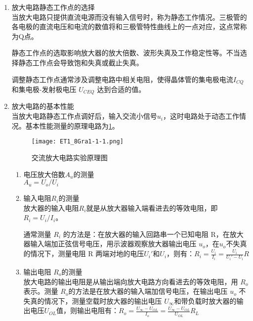 \documentclass[dvipsnames, svgnames,a4paper,11pt]{article}
\begin{document}
	\begin{enumerate}
		\item 放大电路静态工作点的选择\\
		
			当放大电路只提供直流电源而没有输入信号时，称为静态工作情况。三极管的各电极的直流电压和电流的数值将和三极管特性曲线上的一点对应，这点常称为Q点。

			静态工作点的选取影响放大器的放大倍数、波形失真及工作稳定性等。不当选择静态工作点会导致饱和失真或截止失真。

			调整静态工作点通常涉及调整电路中相关电阻，使得晶体管的集电极电流$ I_{CQ} $和集电极-发射极电压 $U_{CEQ}$ 达到合适的值。


		
		\item 放大电路的基本性能\\
		
			当放大电路静态工作点调好后，输入交流小信号$u_i$，这时电路处于动态工作情况。基本性能测量的原理电路为\cref{fig:ET1_8Gra1-1-1}。


			\begin{figure}[htbp]
				\centering
				\texttt{[image: ET1\_8Gra1-1-1.png]}
				\caption{交流放大电路实验原理图}
				\label{fig:ET1_8Gra1-1-1}
			\end{figure}

			\begin{enumerate}
				\item 电压放大倍数$ A_u $的测量\\
					$A_u =U_o/U_i$

				\item 输入电阻$ R_i$的测量\\
					放大器的输入电阻$ R_i$就是从放大器输入端看进去的等效电阻，即$R_i=U_i/I_i$。

					通常测量 $ R_i$ 的方法是：在放大器的输入回路串一个已知电阻 R，在放大器输入端加正弦信号电压，用示波器观察放大器输出电压 $u_o$，在$u_o$不失真的情况下，测量电阻 R 两端对地的电压$U_i'$和$U_i$，则有：$R_i=\frac{U_i}{I_i}=\frac{U_i}{U_i'-U_i}R$ 

				\item 输出电阻 $R_o$的测量\\
					放大电路的输出电阻是从输出端向放大电路方向看进去的等效电阻，用 $R_o$ 表示。测量 $R_o$的方法是在放大器的输入端加信号电压，在输出电压 $u_o$ 不失真的情况下，测量空载时放大器的输出电压 $U_\infty$和带负载时放大器的输出电压$ U_{OL}$值，则输出电阻有：$R_o=\frac{U_\infty-U_{OL}}{I_o}=\frac{{U_\infty-U_{OL}}}{U_{OL}}R_L$

			\end{enumerate}



	\end{enumerate}
	
\end{document}

